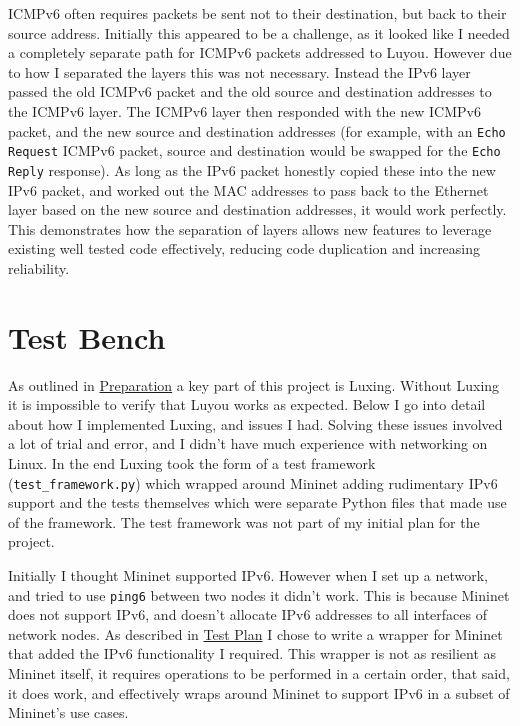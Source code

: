 \documentclass[12pt,a4paper,twoside,openright]{report}
\begin{document}
ICMPv6 often requires packets be sent not to their destination, but back to their source address.  Initially this appeared to be a challenge, as it looked like I needed a completely separate path for ICMPv6 packets addressed to Luyou. However due to how I separated the layers this was not necessary. Instead the IPv6 layer passed the old ICMPv6 packet and the old source and destination addresses to the ICMPv6 layer. The ICMPv6 layer then responded with the new ICMPv6 packet, and the new source and destination addresses (for example, with an \verb!Echo Request! ICMPv6 packet, source and destination would be swapped for the \verb!Echo Reply! response).  As long as the IPv6 packet honestly copied these into the new IPv6 packet, and worked out the MAC addresses to pass back to the Ethernet layer based on the new source and destination addresses, it would work perfectly. This demonstrates how the separation of layers allows new features to leverage existing well tested code effectively, reducing code duplication and increasing reliability.

\section{Test Bench}

As outlined in \hyperref[chap::preparation]{Preparation} a key part of this project is Luxing. Without Luxing it is impossible to verify that Luyou works as expected.  Below I go into detail about how I implemented Luxing, and issues I had.  Solving these issues involved a lot of trial and error, and I didn't have much experience with networking on Linux.  In the end Luxing took the form of a test framework (\verb!test_framework.py!) which wrapped around Mininet adding rudimentary IPv6 support and the tests themselves which were separate Python files that made use of the framework. The test framework was not part of my initial plan for the project.

\bigskip

Initially I thought Mininet\cite{mininet} supported IPv6.  However when I set up a network, and tried to use \verb!ping6! between two nodes it didn't work.  This is because Mininet does not support IPv6, and doesn't allocate IPv6 addresses to all interfaces of network nodes.  As described in \hyperref[sec::test_plan]{Test Plan} I chose to write a wrapper for Mininet that added the IPv6 functionality I required.  This wrapper is not as resilient as Mininet itself, it requires operations to be performed in a certain order, that said, it does work, and effectively wraps around Mininet to support IPv6 in a subset of Mininet's use cases.
\end{document}
